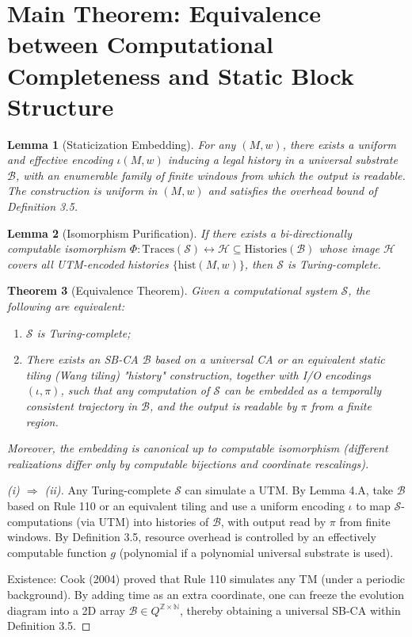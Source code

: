 \documentclass[12pt]{article}
\theoremstyle{plain}
\newtheorem{theorem}{Theorem}[section]
\newtheorem{lemma}[theorem]{Lemma}
\theoremstyle{definition}
\begin{document}
\section{Main Theorem: Equivalence between Computational Completeness and Static Block Structure}

\begin{lemma}[Staticization Embedding]
For any $(M,w)$, there exists a uniform and effective encoding $\iota(M,w)$ inducing a legal history in a universal substrate $\mathcal{B}$, with an enumerable family of finite windows from which the output is readable. The construction is uniform in $(M,w)$ and satisfies the overhead bound of Definition 3.5.
\end{lemma}

\begin{lemma}[Isomorphism Purification]
If there exists a bi-directionally computable isomorphism $\Phi: \mathrm{Traces}(\mathcal{S})\leftrightarrow \mathcal{H}\subseteq\mathrm{Histories}(\mathcal{B})$ whose image $\mathcal{H}$ covers all UTM-encoded histories $\{\mathrm{hist}(M,w)\}$, then $\mathcal{S}$ is Turing-complete.
\end{lemma}

\begin{theorem}[Equivalence Theorem]
Given a computational system $\mathcal{S}$, the following are equivalent:

\begin{enumerate}
\item[(i)] $\mathcal{S}$ is Turing-complete;

\item[(ii)] There exists an SB-CA $\mathcal{B}$ based on a universal CA or an equivalent static tiling (Wang tiling) "history" construction, together with I/O encodings $(\iota,\pi)$, such that any computation of $\mathcal{S}$ can be embedded as a temporally consistent trajectory in $\mathcal{B}$, and the output is readable by $\pi$ from a finite region.
\end{enumerate}

Moreover, the embedding is canonical up to computable isomorphism (different realizations differ only by computable bijections and coordinate rescalings).
\end{theorem}

\begin{proof}[(i) $\Rightarrow$ (ii)]
Any Turing-complete $\mathcal{S}$ can simulate a UTM. By Lemma 4.A, take $\mathcal{B}$ based on Rule 110 or an equivalent tiling and use a uniform encoding $\iota$ to map $\mathcal{S}$-computations (via UTM) into histories of $\mathcal{B}$, with output read by $\pi$ from finite windows. By Definition 3.5, resource overhead is controlled by an effectively computable function $g$ (polynomial if a polynomial universal substrate is used).

Existence: Cook (2004)\cite{cook2004} proved that Rule 110 simulates any TM (under a periodic background). By adding time as an extra coordinate, one can freeze the evolution diagram into a 2D array $\mathcal{B}\in Q^{\mathbb{Z}\times \mathbb{N}}$, thereby obtaining a universal SB-CA within Definition 3.5.
\end{proof}
\end{document}
